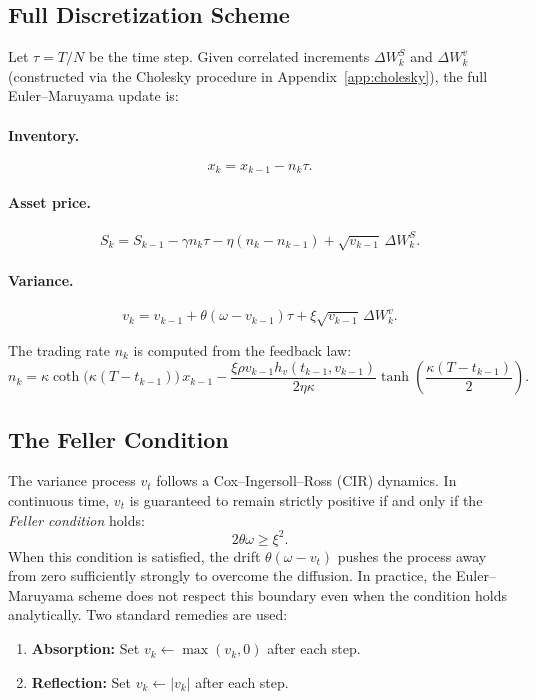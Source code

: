 \documentclass[11pt]{article}
\begin{document}
\subsection{Full Discretization Scheme}

Let $\tau = T/N$ be the time step. Given correlated increments $\Delta W_k^S$ and $\Delta W_k^v$ (constructed via the Cholesky procedure in Appendix~\ref{app:cholesky}), the full Euler--Maruyama update \cite{kloeden1992numerical} is:

\paragraph{Inventory.}
\[
x_k = x_{k-1} - n_k \tau.
\]

\paragraph{Asset price.}
\[
S_k = S_{k-1} - \gamma n_k\tau - \eta(n_k - n_{k-1}) + \sqrt{v_{k-1}}\,\Delta W_k^S.
\]

\paragraph{Variance.}
\[
v_k = v_{k-1} + \theta(\omega - v_{k-1})\tau + \xi\sqrt{v_{k-1}}\,\Delta W_k^v.
\]

The trading rate $n_k$ is computed from the feedback law:
\[
n_k
=
\kappa \coth\!\bigl(\kappa(T-t_{k-1})\bigr)\,x_{k-1}
-
\frac{\xi\rho v_{k-1} h_v(t_{k-1}, v_{k-1})}{2\eta\kappa}
\tanh\!\left(\frac{\kappa(T-t_{k-1})}{2}\right).
\]

\subsection{The Feller Condition}

The variance process $v_t$ follows a Cox--Ingersoll--Ross (CIR) dynamics. In continuous time, $v_t$ is guaranteed to remain strictly positive if and only if the \emph{Feller condition} \cite{cox1985theory} holds:
\[
\boxed{2\theta\omega \geq \xi^2.}
\]
When this condition is satisfied, the drift $\theta(\omega - v_t)$ pushes the process away from zero sufficiently strongly to overcome the diffusion. In practice, the Euler--Maruyama scheme does not respect this boundary even when the condition holds analytically. Two standard remedies are used:

\begin{enumerate}[label=(\roman*)]
\item \textbf{Absorption:} Set $v_k \leftarrow \max(v_k, 0)$ after each step. \cite{glasserman2004monte}
\item \textbf{Reflection:} Set $v_k \leftarrow |v_k|$ after each step. \cite{glasserman2004monte}
\end{enumerate}
\end{document}
